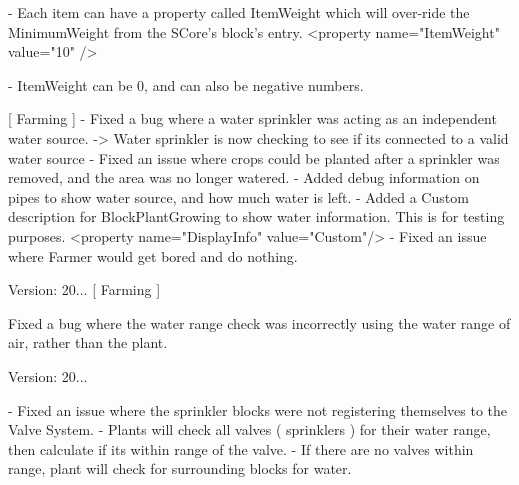 \begin{DoxyVerb}
    - Each item can have a property called ItemWeight which will over-ride the MinimumWeight from the SCore's block's entry.
            <property name="ItemWeight" value="10" />

    - ItemWeight can be 0, and can also be negative numbers.



[ Farming ]
    - Fixed a bug where a water sprinkler was acting as an independent water source. 
        -> Water sprinkler is now checking to see if its connected to a valid water source
    - Fixed an issue where crops could be planted after a sprinkler was removed, and the area was no longer watered.
    - Added debug information on pipes to show water source, and how much water is left.
    - Added a Custom description for BlockPlantGrowing to show water information. This is for testing purposes.
            <property name="DisplayInfo" value="Custom"/>
    - Fixed an issue where Farmer would get bored and do nothing.
\end{DoxyVerb}


Version\+: 20... \mbox{[} Farming \mbox{]}
\begin{DoxyItemize}
\item Fixed a bug where the water range check was incorrectly using the water range of air, rather than the plant.
\end{DoxyItemize}

Version\+: 20... \begin{DoxyVerb}[ Farming ]
    - Fixed an issue where the sprinkler blocks were not registering themselves to the Valve System.
        - Plants will check all valves ( sprinklers ) for their water range, then calculate if its within range of the valve.
        - If there are no valves within range, plant will check for surrounding blocks for water.
\end{DoxyVerb}


